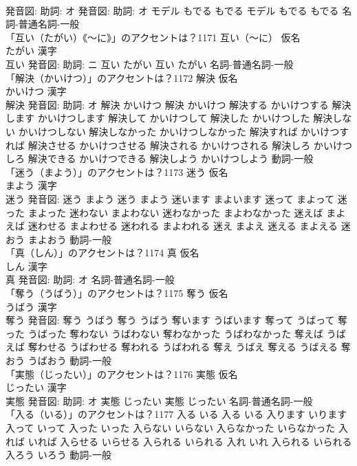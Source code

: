 \documentclass[8pt]{extreport}
\begin{document}
\begin{CJK}{UTF8}{min}
\\	発音図: 助詞: オ 発音図: 助詞: オ	モデル もでる もでる		モデル もでる もでる				名詞-普通名詞-一般 
\\	「互い（たがい）《〜に》」のアクセントは？1171	互い（〜に） 仮名　
\\	たがい 漢字　
\\	互い 発音図: 助詞: ニ	互い たがい		互い たがい				名詞-普通名詞-一般 
\\	「解決（かいけつ）」のアクセントは？1172	解決 仮名　
\\	かいけつ 漢字　
\\	解決 発音図: 助詞: オ	解決 かいけつ		解決 かいけつ 解決する かいけつする 解決します かいけつします 解決して かいけつして 解決した かいけつした 解決しない かいけつしない 解決しなかった かいけつしなかった 解決すれば かいけつすれば 解決させる かいけつさせる 解決される かいけつされる 解決しろ かいけつしろ 解決できる かいけつできる 解決しよう かいけつしよう				動詞-一般 
\\	「迷う（まよう）」のアクセントは？1173	迷う 仮名　
\\	まよう 漢字　
\\	迷う 発音図:	迷う まよう		迷う まよう 迷います まよいます 迷って まよって 迷った まよった 迷わない まよわない 迷わなかった まよわなかった 迷えば まよえば 迷わせる まよわせる 迷われる まよわれる 迷え まよえ 迷える まよえる 迷おう まよおう				動詞-一般 
\\	「真（しん）」のアクセントは？1174	真 仮名　
\\	しん 漢字　
\\	真 発音図: 助詞: オ							名詞-普通名詞-一般 
\\	「奪う（うばう）」のアクセントは？1175	奪う 仮名　
\\	うばう 漢字　
\\	奪う 発音図:	奪う うばう		奪う うばう 奪います うばいます 奪って うばって 奪った うばった 奪わない うばわない 奪わなかった うばわなかった 奪えば うばえば 奪わせる うばわせる 奪われる うばわれる 奪え うばえ 奪える うばえる 奪おう うばおう				動詞-一般 
\\	「実態（じったい）」のアクセントは？1176	実態 仮名　
\\	じったい 漢字　
\\	実態 発音図: 助詞: オ	実態 じったい		実態 じったい				名詞-普通名詞-一般 
\\	「入る（いる）」のアクセントは？1177		入る いる		入る いる 入ります いります 入って いって 入った いった 入らない いらない 入らなかった いらなかった 入れば いれば 入らせる いらせる 入られる いられる 入れ いれ 入られる いられる 入ろう いろう				動詞-一般 

\end{CJK}
\end{document}
